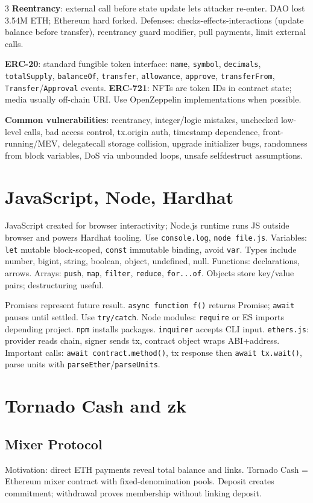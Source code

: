 \documentclass[8pt]{extarticle}
\newcommand{\term}[1]{\textbf{#1}}
\begin{document}
\begin{multicols*}{3}
\term{Reentrancy}: external call before state update lets attacker re-enter. DAO lost 3.54M ETH; Ethereum hard forked. Defenses: checks-effects-interactions (update balance before transfer), reentrancy guard modifier, pull payments, limit external calls.

\term{ERC-20}: standard fungible token interface: \texttt{name}, \texttt{symbol}, \texttt{decimals}, \texttt{totalSupply}, \texttt{balanceOf}, \texttt{transfer}, \texttt{allowance}, \texttt{approve}, \texttt{transferFrom}, \texttt{Transfer}/\texttt{Approval} events. \term{ERC-721}: NFTs are token IDs in contract state; media usually off-chain URI. Use OpenZeppelin implementations when possible.

\term{Common vulnerabilities}: reentrancy, integer/logic mistakes, unchecked low-level calls, bad access control, tx.origin auth, timestamp dependence, front-running/MEV, delegatecall storage collision, upgrade initializer bugs, randomness from block variables, DoS via unbounded loops, unsafe selfdestruct assumptions.

\section{JavaScript, Node, Hardhat}
JavaScript created for browser interactivity; Node.js runtime runs JS outside browser and powers Hardhat tooling. Use \texttt{console.log}, \texttt{node file.js}. Variables: \texttt{let} mutable block-scoped, \texttt{const} immutable binding, avoid \texttt{var}. Types include number, bigint, string, boolean, object, undefined, null. Functions: declarations, arrows. Arrays: \texttt{push}, \texttt{map}, \texttt{filter}, \texttt{reduce}, \texttt{for...of}. Objects store key/value pairs; destructuring useful.

Promises represent future result. \texttt{async function f()} returns Promise; \texttt{await} pauses until settled. Use \texttt{try/catch}. Node modules: \texttt{require} or ES imports depending project. \texttt{npm} installs packages. \texttt{inquirer} accepts CLI input. \texttt{ethers.js}: provider reads chain, signer sends tx, contract object wraps ABI+address. Important calls: \texttt{await contract.method()}, tx response then \texttt{await tx.wait()}, parse units with \texttt{parseEther}/\texttt{parseUnits}.

\section{Tornado Cash and zk}
\subsection{Mixer Protocol}
Motivation: direct ETH payments reveal total balance and links. Tornado Cash = Ethereum mixer contract with fixed-denomination pools. Deposit creates commitment; withdrawal proves membership without linking deposit.


\end{multicols*}
\end{document}
